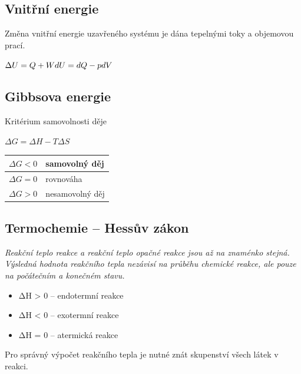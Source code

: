 
\subsection{Vnitřní energie}

Změna vnitřní energie uzavřeného systému je dána tepelnými toky a objemovou prací.

$\Delta U = Q + W\\
dU = dQ - pdV$

\subsection{Gibbsova energie}

Kritérium samovolnosti děje

$\Delta G = \Delta H - T\Delta S$

\begin{tabular}{|c|l|}
	\hline
	$\Delta G < 0$ & samovolný děj \\\hline
	$\Delta G = 0$ & rovnováha \\\hline
	$\Delta G > 0$ & nesamovolný děj \\\hline
\end{tabular}

\subsection{Termochemie -- Hessův zákon}

\textit{Reakční teplo reakce a reakční teplo opačné reakce jsou až na znaménko stejná. Výsledná hodnota reakčního tepla nezávisí na průběhu chemické reakce, ale pouze na počátečním a konečném stavu.}

\begin{itemize}
	\item ΔH > 0 – endotermní reakce
	\item ΔH < 0 – exotermní reakce
	\item ΔH = 0 – atermická reakce
\end{itemize}

Pro správný výpočet reakčního tepla je nutné znát skupenství všech látek v reakci.



